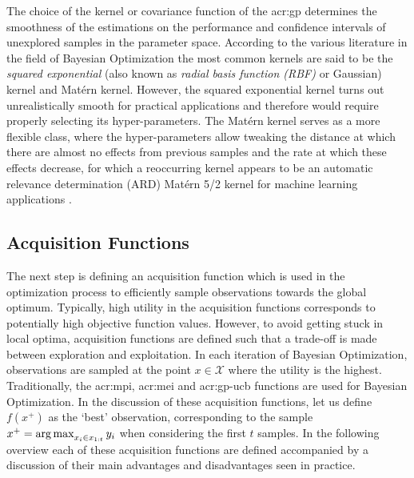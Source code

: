 The choice of the kernel or covariance function of the \acrshort{acr:gp} determines the smoothness of the estimations on the performance and confidence intervals of unexplored samples in the parameter space.
According to the various literature in the field of Bayesian Optimization the most common kernels are said to be the \textit{squared exponential} (also known as \textit{radial basis function (RBF)} or Gaussian) kernel and Mat\'ern kernel.
However, the squared exponential kernel turns out unrealistically smooth for practical applications \cite{snoek2012practical} and therefore would require properly selecting its hyper-parameters.
The Mat\'ern kernel serves as a more flexible class, where the hyper-parameters allow tweaking the distance at which there are almost no effects from previous samples and the rate at which these effects decrease, for which a reoccurring kernel appears to be an automatic relevance determination (ARD) Mat\'ern 5/2 kernel for machine learning applications \cite{snoek2012practical, kawaguchi2015bayesian}.




\subsection*{Acquisition Functions}
\label{sec:bayesian-optimization-acquisition}
The next step is defining an acquisition function which is used in the optimization process to efficiently sample observations towards the global optimum.
Typically, high utility in the acquisition functions corresponds to potentially high objective function values.
However, to avoid getting stuck in local optima, acquisition functions are defined such that a trade-off is made between exploration and exploitation.
In each iteration of Bayesian Optimization, observations are sampled at the point $x \in \mathcal{X}$ where the utility is the highest.
Traditionally, the \acrfull{acr:mpi}, \acrfull{acr:mei} and \acrfull{acr:gp-ucb} functions are used for Bayesian Optimization.
In the discussion of these acquisition functions, let us define $f(x^+)$ as the `best' observation, corresponding to the sample $x^+ = \operatorname*{arg\,max}_{x_i \in x_{1:t}} y_i$ when considering the first $t$ samples.
In the following overview each of these acquisition functions are defined accompanied by a discussion of their main advantages and disadvantages seen in practice.

